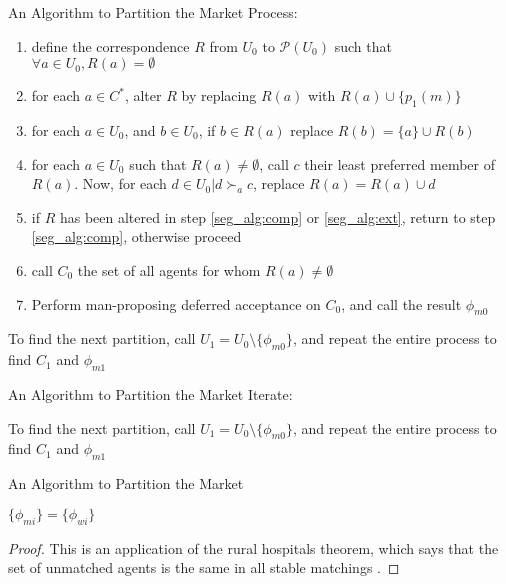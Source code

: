 \documentclass{beamer}
\begin{document}
 \begin{frame}{An Algorithm to Partition the Market}
	Process:
	\begin{enumerate}
		\item define the correspondence $R$ from $U_0$ to $\mathcal{P}(U_0)$ such that $\forall a \in U_0, R(a) = \emptyset$
		\item for each $a \in C^*$, alter $R$ by replacing $R(a)$ with  $R(a) \cup \{p_1(m)\}$
		\item  \label{seg_alg:comp} for each $a \in U_0$, and $b \in U_0$, if $ b \in R(a)$ replace $R(b) = \{a\} \cup R(b)$
		\item  \label{seg_alg:ext} for each $a \in U_0$ such that $R(a) \neq \emptyset$, call  $c$ their least preferred member of $R(a)$. Now, for each $d \in U_0 | d \succ_a c$, replace $R(a) = R(a) \cup d$ 
		\item if $R$ has been altered in step \ref*{seg_alg:comp} or \ref*{seg_alg:ext}, return to step \ref*{seg_alg:comp}, otherwise proceed
		\item call $C_0$ the set of all agents for whom $R(a) \neq \emptyset$
		\item Perform man-proposing deferred acceptance on $C_0$, and call the result $\phi_{m0}$
	\end{enumerate}
	
	To find the next partition, call $U_1 = U_0 \setminus \{\phi_{m0}\}$, and repeat the entire process to find $C_1$ and $\phi_{m1}$
	
\end{frame}

 \begin{frame}{An Algorithm to Partition the Market}
	Iterate:
	
	To find the next partition, call $U_1 = U_0 \setminus \{\phi_{m0}\}$, and repeat the entire process to find $C_1$ and $\phi_{m1}$
	

\end{frame}

 \begin{frame}{An Algorithm to Partition the Market}
	\begin{lemma}
		$\{\phi_{mi}\}=\{\phi_{wi}\}$
	\end{lemma}
	\begin{proof}
		This is an application of the rural hospitals theorem, which says that the set of unmatched agents is the same in all stable matchings \cite{Roth1986}.
	\end{proof}
\end{frame}
\end{document}
